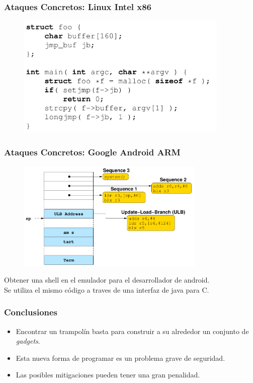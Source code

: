 \documentclass{beamer}
\begin{document}
\begin{frame}
    \frametitle{Ataques Concretos: Linux Intel x86}
    
    \begin{figure}
        \centering
        \includegraphics[width=0.9\textwidth]{LinuxIntel86.png}
    \end{figure}
        
    
\end{frame}

\begin{frame}
    \frametitle{Ataques Concretos: Google Android ARM}
    \begin{figure}
        \centering
        \includegraphics[width=0.8\textwidth]{GoogleAndroidARM.png}
    \end{figure}
        
    Obtener una shell en el emulador para el desarrollador de android.\\
    Se utiliza el mismo código a traves de una interfaz de java para C.
\end{frame}

\begin{frame}
    \frametitle{Conclusiones}
    \begin{itemize}
        \item Encontrar un trampolín basta para construir a su alrededor un conjunto de \textit{gadgets}.
        \item Esta nueva forma de programar es un problema grave de seguridad.
        \item Las posibles mitigaciones pueden tener una gran penalidad.
    \end{itemize}
\end{frame}
\end{document}
